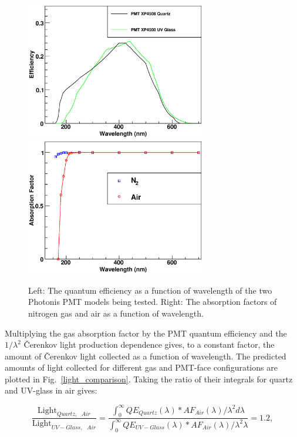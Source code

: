\begin{figure}
\vspace{0.5cm}
\begin{centering}
\includegraphics[height=6.0cm]{PMT-studies/pmt_2.eps}
\includegraphics[height=6.0cm]{PMT-studies/pmt_1.eps}
\vspace{0.5cm}
\caption{\small{Left: The quantum efficiency as a function of wavelength 
of the two Photonis PMT models being tested. Right: The absorption factors 
of nitrogen gas and air as a function of wavelength.}}
\label{quanteff_absorb}
\end{centering}
\end{figure}

Multiplying the gas absorption factor by the PMT quantum efficiency
and the $1/\lambda^2$ {\v C}erenkov light production dependence
gives, to a constant factor, the amount of {\v C}erenkov light collected
as a function of wavelength. The predicted amounts of light collected
for different gas and PMT-face configurations are plotted in 
Fig.~\ref{light_comparison}.  Taking the ratio of their integrals
for quartz and UV-glass in air gives:

\begin{equation}
\label{eq:light_ratio}
\frac{\textrm{Light}_{Quartz,\textrm{ }Air}}
{\textrm{Light}_{UV-Glass,\textrm{ }Air}} = 
\frac{\int_{0}^{\infty}QE_{Quartz}(\lambda)*AF_{Air}(\lambda)/\lambda^2d\lambda}
{\int_{0}^{\infty}QE_{UV-Glass}(\lambda)*AF_{Air}(\lambda)/\lambda^2\lambda}
= 1.2,
\end{equation}

